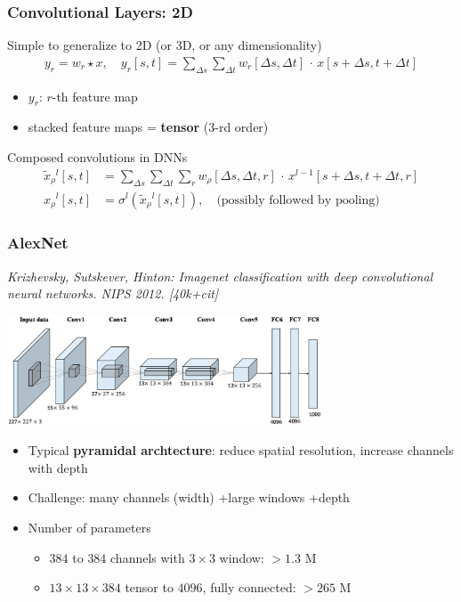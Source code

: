 \documentclass[compress]{beamer}
\newcommand{\x}{{x}}
\newcommand{\w}{{w}}
\renewcommand{\l}{{^l}}
\newcommand{\lminus}{{^{l-1}}}
\newcommand{\textbblue}[1]{{\bf\color{Blue} #1}}
\newcommand{\is}[1]{\setlength{\itemsep}{#1}}
\begin{document}
\begin{frame} \frametitle{Convolutional Layers: 2D}
Simple to generalize to 2D (or 3D, or any dimensionality)
\begin{align*}
y_r= \w_r \star \x, \quad   y_r[s,t] = \sum_{\Delta s} \sum_{\Delta t} w_r[\Delta s,\Delta t] \, \cdot\,x[s+\Delta s, t+\Delta t ] 
\end{align*}
\vspace*{-4mm}
\begin{itemize} \is{2mm}
\item $y_r$: $r$-th feature map
\item stacked feature maps = \textbblue{tensor} ($3$-rd order)
\end{itemize}
\vspace*{4mm}

Composed convolutions in DNNs
\begin{align*}
\tilde \x_\rho\l[s,t] & = \sum_{\Delta s} \sum_{\Delta t} \sum_r w_\rho[\Delta s,\Delta t,r] \, \cdot \, x\lminus[s+\Delta s, t+\Delta t , r]  \\
\x_\rho\l[s,t] & = \sigma\l(\tilde \x_\rho\l[s,t]), \quad \text{(possibly followed by pooling)}
\end{align*}
\end{frame}

\begin{frame} \frametitle{AlexNet}
{\small \textit{Krizhevsky, Sutskever, Hinton: Imagenet classification with deep convolutional neural networks. NIPS 2012. [40k+cit]}}
\begin{center}
\includegraphics[width=0.7\textwidth]{./figures/alexnet.png}
\end{center}
\begin{itemize} \is{2mm}
\item Typical \textbblue{pyramidal archtecture}: reduce spatial resolution, increase channels with depth
\item Challenge: many channels (width) +large windows +depth
\item Number of parameters
\begin{itemize}\is{1mm}
\item $384$ to $384$ channels with  $3 \times 3$ window: $>1.3$ M
\item $13 \times 13 \times 384$ tensor to $4096$, fully connected: $>265$ M
\end{itemize}
\end{itemize}
\end{frame}
\end{document}

